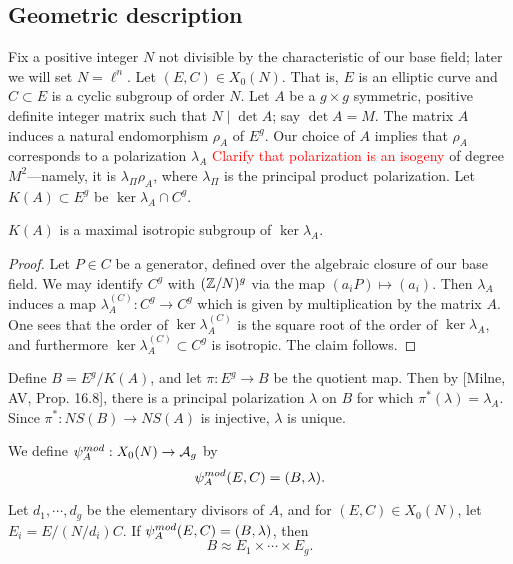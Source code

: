\documentclass{amsart}
\begin{document}
\subsection{Geometric description}
\label{sec:geo-desc}

Fix a positive integer $N$ not divisible by the characteristic of our base field; later we will set $N = \ell^n$. Let $(E, C) \in X_0(N)$. That is, $E$ is an elliptic curve and $C \subset E$ is a cyclic subgroup of order $N$. Let $A$ be a $g \times g$ symmetric, positive definite integer matrix such that $N \mid \det A$; say $\det A = M$. The matrix $A$ induces a natural endomorphism $\rho_A$ of $E^g$. Our choice of $A$ implies that $\rho_A$ corresponds to a polarization $\lambda_A$ \textcolor{red}{Clarify that polarization is an isogeny} of degree $M^2$---namely, it is $\lambda_{\Pi}\rho_A$, where $\lambda_\Pi$ is the principal product polarization. Let $K(A) \subset E^g$ be $\ker \lambda_A \cap C^g$.

\begin{lemma}
  $K(A)$ is a maximal isotropic subgroup of $\ker \lambda_A$.
\end{lemma}

\begin{proof}
  Let $P \in C$ be a generator, defined over the algebraic closure of our base field. We may identify $C^g$ with $(\mathbb{Z}/N)^g$ via the map $(a_iP) \mapsto (a_i)$. Then $\lambda_A$ induces a map $\lambda_A^{(C)}:C^g \to C^g$ which is given by multiplication by the matrix $A$. One sees that the order of $\ker \lambda_A^{(C)}$ is the square root of the order of $\ker \lambda_A$, and furthermore $\ker \lambda_A^{(C)} \subset C^g$ is isotropic. The claim follows.
\end{proof}

Define $B = E^g/K(A)$, and let $\pi: E^g \to B$ be the quotient map. Then by [Milne, AV, Prop. 16.8], there is a principal polarization $\lambda$ on $B$ for which $\pi^*(\lambda) = \lambda_A$. Since $\pi^*: NS(B) \to NS(A)$ is injective, $\lambda$ is unique.

We define $\psi_{A}^{mod}: X_0(N) \to \mathcal{A}_g$ by
\[
  \psi_{A}^{mod}(E,C) = (B,\lambda).
\]

\begin{proposition}
  Let $d_1, \cdots, d_g$ be the elementary divisors of $A$, and for $(E,C) \in X_0(N)$, let $E_i = E/(N/d_i)C$. If $\psi_{A}^{mod}(E,C) = (B,\lambda)$, then
  \[
    B \approx E_1 \times \cdots \times E_g.
  \]
\end{proposition}
\end{document}
